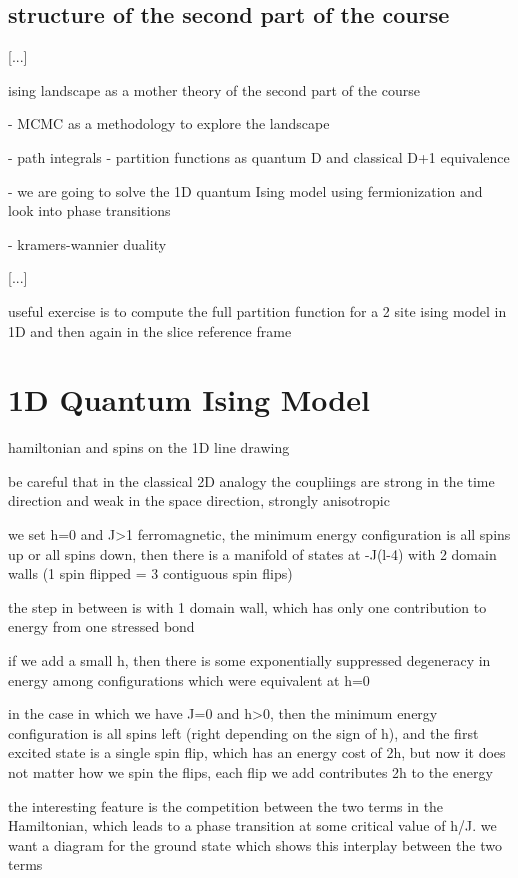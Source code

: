 \section{structure of the second part of the course}

 [...]

ising landscape as a mother theory of the second part of the course

- MCMC as a methodology to explore the landscape

- path integrals - partition functions as quantum D and classical D+1 equivalence

- we are going to solve the 1D quantum Ising model using fermionization and look into phase transitions

- kramers-wannier duality

    [...]

useful exercise is to compute the full partition function for a 2 site ising model in 1D and then again in the slice reference frame


\chapter{1D Quantum Ising Model}

hamiltonian and spins on the 1D line drawing

be careful that in the classical 2D analogy the coupliings are strong in the time direction and weak in the space direction, strongly anisotropic

we set h=0 and J>1 ferromagnetic, the minimum energy configuration is all spins up or all spins down, then there is a manifold of states at -J(l-4) with 2 domain walls (1 spin flipped = 3 contiguous spin flips)

the step in between is with 1 domain wall, which has only one contribution to energy from one stressed bond

if we add a small h, then there is some exponentially suppressed degeneracy in energy among configurations which were equivalent at h=0

in the case in which we have J=0 and h>0, then the minimum energy configuration is all spins left (right depending on the sign of h), and the first excited state is a single spin flip, which has an energy cost of 2h, but now it does not matter how we spin the flips, each flip we add contributes 2h to the energy

the interesting feature is the competition between the two terms in the Hamiltonian, which leads to a phase transition at some critical value of h/J. we want a diagram for the ground state which shows this interplay between the two terms

